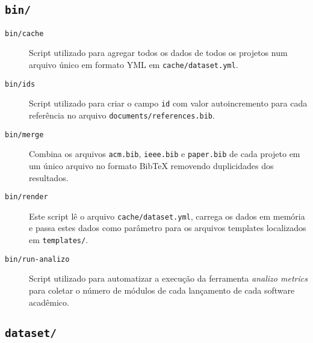 \subsection{\texttt{bin/}}

\begin{description}
  \item [\texttt{bin/cache}] Script utilizado para agregar todos os dados
  de todos os projetos num arquivo único em formato YML em \texttt{cache/dataset.yml}.

  \item [\texttt{bin/ids}]
    Script utilizado para criar o campo \texttt{id} com valor autoincremento
    para cada referência no arquivo \texttt{documents/references.bib}.

  \item [\texttt{bin/merge}]
    Combina os arquivos \texttt{acm.bib}, \texttt{ieee.bib} e
    \texttt{paper.bib} de cada projeto em um único arquivo no formato BibTeX
    removendo duplicidades dos resultados.

  \item [\texttt{bin/render}]
    Este script lê o arquivo \texttt{cache/dataset.yml}, carrega os dados em
    memória e passa estes dados como parâmetro para os arquivos templates
    localizados em \texttt{templates/}.

  \item [\texttt{bin/run-analizo}] 
    Script utilizado para automatizar a execução da ferramenta {\it analizo
    metrics} para coletar o número de módulos de cada lançamento de cada
    software acadêmico.

\end{description}

\subsection{\texttt{dataset/}}

